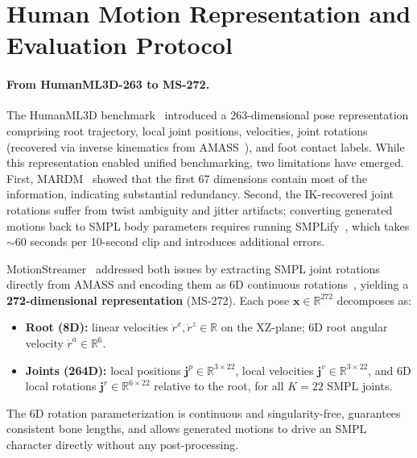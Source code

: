 \documentclass{article}
\begin{document}



\appendix

\section{Human Motion Representation and Evaluation Protocol}
\label{app:representation}

\paragraph{From HumanML3D-263 to MS-272.}
The HumanML3D benchmark~\citep{Guo_2022_CVPR} introduced a 263-dimensional pose representation comprising root trajectory, local joint positions, velocities, joint rotations (recovered via inverse kinematics from AMASS~\citep{mahmood2019amass}), and foot contact labels.
While this representation enabled unified benchmarking, two limitations have emerged.
First, MARDM~\citep{meng2024rethinking} showed that the first 67 dimensions contain most of the information, indicating substantial redundancy.
Second, the IK-recovered joint rotations suffer from twist ambiguity and jitter artifacts; converting generated motions back to SMPL body parameters requires running SMPLify~\citep{bogo2016keep}, which takes $\sim$60 seconds per 10-second clip and introduces additional errors.

MotionStreamer~\citep{xiao2025motionstreamer} addressed both issues by extracting SMPL joint rotations directly from AMASS and encoding them as 6D continuous rotations~\citep{zhou2019continuity}, yielding a \textbf{272-dimensional representation} (MS-272).
Each pose $\mathbf{x} \in \mathbb{R}^{272}$ decomposes as:
\begin{itemize}
    \item \textbf{Root (8D):} linear velocities $\dot{r}^x, \dot{r}^z \in \mathbb{R}$ on the XZ-plane; 6D root angular velocity $\dot{r}^a \in \mathbb{R}^6$.
    \item \textbf{Joints (264D):} local positions $\mathbf{j}^p \in \mathbb{R}^{3 \times 22}$, local velocities $\mathbf{j}^v \in \mathbb{R}^{3 \times 22}$, and 6D local rotations $\mathbf{j}^r \in \mathbb{R}^{6 \times 22}$ relative to the root, for all $K=22$ SMPL joints.
\end{itemize}
The 6D rotation parameterization is continuous and singularity-free, guarantees consistent bone lengths, and allows generated motions to drive an SMPL character directly without any post-processing.
\end{document}
